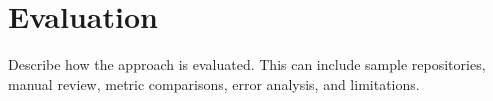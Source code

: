 \chapter{Evaluation}
\label{chap:evaluation}

Describe how the approach is evaluated. This can include sample repositories,
manual review, metric comparisons, error analysis, and limitations.
